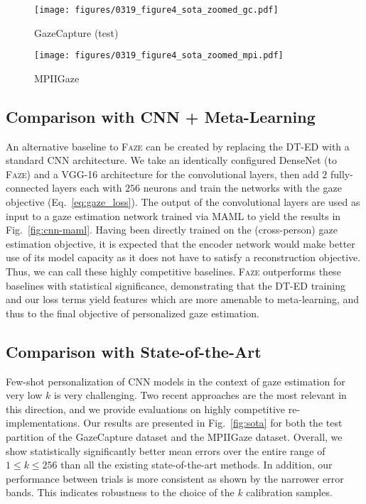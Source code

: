 \documentclass[10pt,twocolumn,letterpaper]{article}
\newcommand{\faze}[0]{\textsc{Faze}\xspace}
\begin{document}
\begin{figure*}
    \centering
    \begin{subfigure}[b]{0.48\textwidth}
        \texttt{[image: figures/0319\_figure4\_sota\_zoomed\_gc.pdf]}
        \vskip -1mm
        \caption{GazeCapture (test)}
        \label{fig:sota_gc}
    \end{subfigure}
    \hspace*{\fill}
    \begin{subfigure}[b]{0.48\textwidth}
        \texttt{[image: figures/0319\_figure4\_sota\_zoomed\_mpi.pdf]}
        \vskip -1mm
        \caption{MPIIGaze}
        \label{fig:sota_mpi}
    \end{subfigure}
    \vskip -2mm
    \caption{Comparison of \faze against state-of-the-art person-specific gaze estimation methods \cite{Liu2018BMVC,Zhang2019CHI}
    }
    \label{fig:sota}
    \vskip -3mm
\end{figure*}


\subsection{Comparison with CNN + Meta-Learning}
An alternative baseline to \faze can be created by replacing the DT-ED with a standard CNN 
architecture.
We take an identically configured DenseNet (to \faze) and a VGG-16 architecture for the convolutional layers, then add $2$ fully-connected layers each with $256$ neurons and train the networks with the gaze objective (Eq.~\ref{eq:gaze_loss}).
The output of the convolutional layers are used as input to a gaze estimation network trained via MAML to yield the results in Fig.~\ref{fig:cnn-maml}.
Having been directly trained on the (cross-person) gaze estimation objective, it is expected that the encoder network would make better use of its model capacity as it does not have to satisfy a reconstruction objective. Thus, we can call these highly competitive baselines.
\faze outperforms these baselines with statistical significance, demonstrating that the DT-ED training and our loss terms yield features which are more amenable to meta-learning, and thus to the final objective of personalized gaze estimation.

\subsection{Comparison with State-of-the-Art}

 
Few-shot personalization of CNN models in the context of gaze estimation for very low $k$ is very challenging.
Two recent approaches \cite{Zhang2019CHI,Liu2018BMVC} are the most relevant in this direction, and we provide evaluations on highly competitive re-implementations.
Our results are presented in Fig.~\ref{fig:sota} for both the test partition of the GazeCapture dataset and the MPIIGaze dataset.
Overall, we show statistically significantly better mean errors over the entire range of $1\leq k\leq 256$ than all the existing state-of-the-art methods.
In addition, our performance between trials is more consistent as shown by the narrower error bands. This indicates robustness to the choice of the $k$ calibration samples. 
\end{document}
